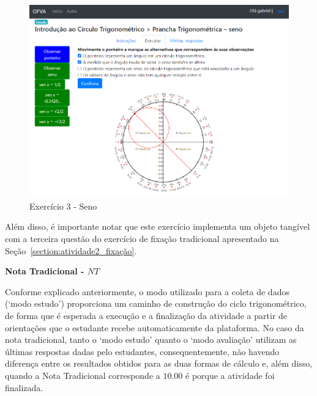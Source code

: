 \begin{figure}[htb]
	\centering
	\includegraphics[width=0.9\linewidth]{chapters/results/Fase 3/E3_Virtual.png}
	\caption{Exercício 3 - Seno}
	\label{fig:E3}
\end{figure}

Além disso, é importante notar que este exercício implementa um objeto tangível com a terceira questão do exercício de fixação tradicional apresentado na Seção~\ref{section:atividade2_fixação}.

\textbf{Nota Tradicional - $NT$}

Conforme explicado anteriormente, o modo utilizado para a coleta de dados (`modo estudo') proporciona um caminho de construção do ciclo trigonométrico, de forma que é esperada a execução e a finalização da atividade a partir de orientações que o estudante recebe automaticamente da plataforma. No caso da nota tradicional, tanto o `modo estudo' quanto o `modo avaliação' utilizam as últimas respostas dadas pelo estudantes, consequentemente, não havendo diferença entre os resultados obtidos para as duas formas de cálculo e, além disso, quando a Nota Tradicional corresponde a $10.00$ é porque a atividade foi finalizada.

